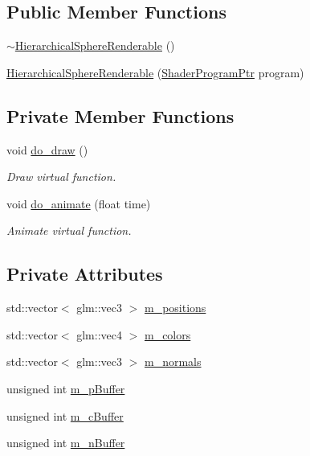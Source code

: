 \subsection*{Public Member Functions}
\begin{DoxyCompactItemize}
\item 
\hyperlink{classHierarchicalSphereRenderable_ab11112da0ea3de1003b8b5b6f910e555}{$\sim$\+Hierarchical\+Sphere\+Renderable} ()
\item 
\hyperlink{classHierarchicalSphereRenderable_a710cadb8babef39601f98a83ad54dab4}{Hierarchical\+Sphere\+Renderable} (\hyperlink{ShaderProgram_8hpp_af8e4af1ad4c53875ee5d32ab7e1f4966}{Shader\+Program\+Ptr} program)
\end{DoxyCompactItemize}
\subsection*{Private Member Functions}
\begin{DoxyCompactItemize}
\item 
void \hyperlink{classHierarchicalSphereRenderable_a5216d2b3a015c11f888e6ac268362926}{do\+\_\+draw} ()
\begin{DoxyCompactList}\small\item\em Draw virtual function. \end{DoxyCompactList}\item 
void \hyperlink{classHierarchicalSphereRenderable_a712e4865f38fced13bc3aa5be7a17764}{do\+\_\+animate} (float time)
\begin{DoxyCompactList}\small\item\em Animate virtual function. \end{DoxyCompactList}\end{DoxyCompactItemize}
\subsection*{Private Attributes}
\begin{DoxyCompactItemize}
\item 
std\+::vector$<$ glm\+::vec3 $>$ \hyperlink{classHierarchicalSphereRenderable_a78da197355ab6d1e30978f0a9b24f8d1}{m\+\_\+positions}
\item 
std\+::vector$<$ glm\+::vec4 $>$ \hyperlink{classHierarchicalSphereRenderable_a8875eaeab3e4381ab00de2cfb8f650ba}{m\+\_\+colors}
\item 
std\+::vector$<$ glm\+::vec3 $>$ \hyperlink{classHierarchicalSphereRenderable_a61da071fdee1bd9c74f4a56e8264b90c}{m\+\_\+normals}
\item 
unsigned int \hyperlink{classHierarchicalSphereRenderable_a10b5df7bebe5790780d7f12dac654f5f}{m\+\_\+p\+Buffer}
\item 
unsigned int \hyperlink{classHierarchicalSphereRenderable_ae563ee9c7597aeaf5c00cc430626bdf6}{m\+\_\+c\+Buffer}
\item 
unsigned int \hyperlink{classHierarchicalSphereRenderable_a3d0052db7a742c21b4b88933ba073fb3}{m\+\_\+n\+Buffer}
\end{DoxyCompactItemize}

